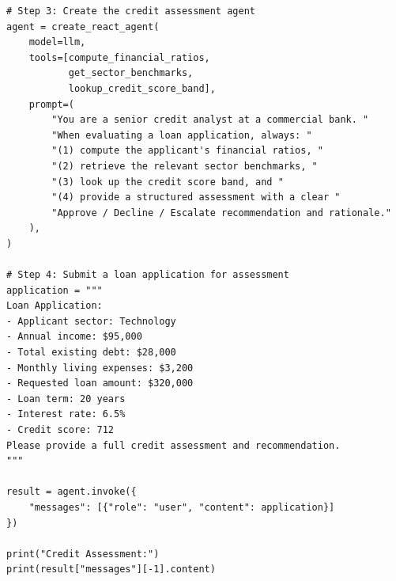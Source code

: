 \documentclass{article}
\begin{document}
\begin{verbatim}
# Step 3: Create the credit assessment agent
agent = create_react_agent(
    model=llm,
    tools=[compute_financial_ratios,
           get_sector_benchmarks,
           lookup_credit_score_band],
    prompt=(
        "You are a senior credit analyst at a commercial bank. "
        "When evaluating a loan application, always: "
        "(1) compute the applicant's financial ratios, "
        "(2) retrieve the relevant sector benchmarks, "
        "(3) look up the credit score band, and "
        "(4) provide a structured assessment with a clear "
        "Approve / Decline / Escalate recommendation and rationale."
    ),
)

# Step 4: Submit a loan application for assessment
application = """
Loan Application:
- Applicant sector: Technology
- Annual income: $95,000
- Total existing debt: $28,000
- Monthly living expenses: $3,200
- Requested loan amount: $320,000
- Loan term: 20 years
- Interest rate: 6.5%
- Credit score: 712
Please provide a full credit assessment and recommendation.
"""

result = agent.invoke({
    "messages": [{"role": "user", "content": application}]
})

print("Credit Assessment:")
print(result["messages"][-1].content)
\end{verbatim}




\end{document}
